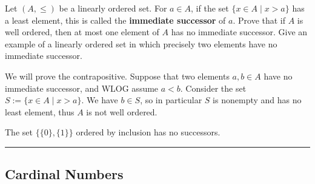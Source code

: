 \begin{exercise}
    Let $(A,\le)$ be a linearly ordered set. For $a\in A$, if the set $\{x\in A\mid x > a\}$ has a least element, this is called the \textbf{immediate successor} of $a$. Prove that if $A$ is well ordered, then at most one element of $A$ has no immediate successor. Give an example of a linearly ordered set in which precisely two elements have no immediate successor.
\end{exercise}
\begin{solution}
    We will prove the contrapositive. Suppose that two elements $a,b\in A$ have no immediate successor, and WLOG assume $a < b$. Consider the set $S := \{x\in A\mid x > a\}$. We have $b\in S$, so in particular $S$ is nonempty and has no least element, thus $A$ is not well ordered.

    The set $\{\{0\},\{1\}\}$ ordered by inclusion has no successors.
\end{solution}
\hrule

\pagebreak
\subsection{Cardinal Numbers}
